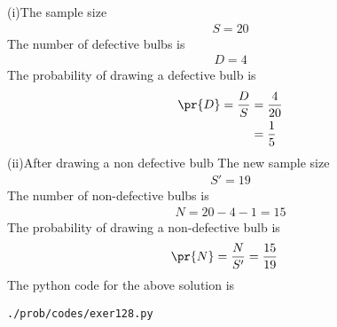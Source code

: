 (i)The sample size 
\begin{align}
S=20
\end{align}
The number of defective bulbs is 
\begin{align}
D=4
\end{align}
The probability of drawing a defective bulb is 
\begin{align}
\pr{D} = \frac{D}{S} &= \frac{4}{20}
\\
&= \frac{1}{5}
\end{align}
(ii)After drawing a non defective bulb 
The new sample size 
\begin{align}
S'=19
\end{align}
The number of non-defective bulbs is 
\begin{align}
N=20-4-1=15
\end{align}
The probability of drawing a non-defective bulb is 
\begin{align}
\pr{N} = \frac{N}{S'} &= \frac{15}{19}
\end{align}
The python code for the above solution is
\begin{lstlisting}
./prob/codes/exer128.py
\end{lstlisting}
